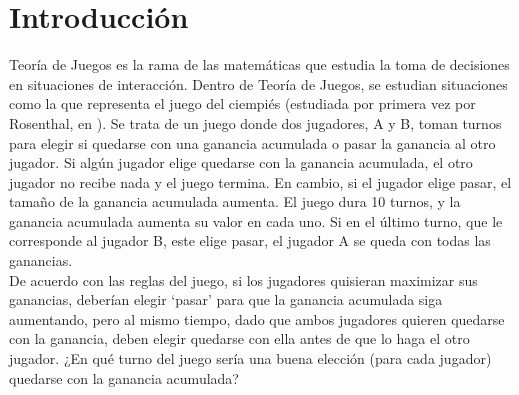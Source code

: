
\chapter{Introducción} %

\label{Chapter1} %


\newcommand{\keyword}[1]{\textbf{#1}}
\newcommand{\tabhead}[1]{\textbf{#1}}
\newcommand{\code}[1]{\texttt{#1}}
\newcommand{\file}[1]{\texttt{\bfseries#1}}
\newcommand{\option}[1]{\texttt{\itshape#1}}


Teoría de Juegos es la rama de las matemáticas que estudia la toma de decisiones en situaciones de interacción. Dentro de Teoría de Juegos, se estudian situaciones como la que representa el juego del ciempiés (estudiada por primera vez por Rosenthal, en \citeyear{Rosenthal}). Se trata de un juego donde dos jugadores, A y B, toman turnos para elegir si quedarse con una ganancia acumulada o pasar la ganancia al otro jugador. Si algún jugador elige quedarse con la ganancia acumulada, el otro jugador no recibe nada y el juego termina. En cambio, si el jugador elige pasar, el tamaño de la ganancia acumulada aumenta. El juego dura 10 turnos, y la ganancia acumulada aumenta su valor en cada uno. Si en el último turno, que le corresponde al jugador B, este elige pasar, el jugador A se queda con todas las ganancias.\\

De acuerdo con las reglas del juego, si los jugadores quisieran maximizar sus ganancias, deberían elegir ‘pasar’ para que la ganancia acumulada siga aumentando, pero al mismo tiempo, dado que ambos jugadores quieren quedarse con la ganancia, deben elegir quedarse con ella antes de que lo haga el otro jugador. ¿En qué turno del juego sería una buena elección (para cada jugador) quedarse con la ganancia acumulada?\\

